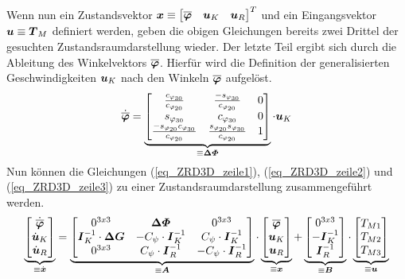 Wenn nun ein Zustandsvektor $\boldsymbol{x} \equiv \begin{bmatrix} \boldsymbol{\overline{\varphi}} & \boldsymbol{u}_K & \boldsymbol{u}_R\end{bmatrix}^T$ und ein Eingangsvektor $\boldsymbol{u} \equiv \boldsymbol{T}_M$ definiert werden, geben die obigen Gleichungen bereits zwei Drittel der gesuchten Zustandsraumdarstellung wieder. Der letzte Teil ergibt sich durch die Ableitung des Winkelvektors $\boldsymbol{\overline{\varphi}}$. Hierfür wird die Definition der generalisierten Geschwindigkeiten $\boldsymbol{u}_K$ nach den Winkeln $\boldsymbol{\overline{\varphi}}$ aufgelöst.
\begin{equation}
\label{eq_ZRD3D_zeile1}
\dot{\boldsymbol{\overline{\varphi}}} = \underbrace{\begin{bmatrix}
\frac{c_{\varphi_{30}}}{c_{\varphi_{20}}} & \frac{-s_{\varphi_{30}}}{c_{\varphi_{20}}} & 0 
\\
s_{\varphi_{30}} & c_{\varphi_{30}} & 0 
\\
\frac{-s_{\varphi_{20}}c_{\varphi_{30}}}{c_{\varphi_{20}}} &
\frac{s_{\varphi_{20}}s_{\varphi_{30}}}{c_{\varphi_{20}}} & 1
\end{bmatrix}}_{\equiv \boldsymbol{\Delta\varPhi}}\cdot \boldsymbol{u}_K
\end{equation}
Nun können die Gleichungen (\ref{eq_ZRD3D_zeile1}), (\ref{eq_ZRD3D_zeile2}) und (\ref{eq_ZRD3D_zeile3}) zu einer Zustandsraumdarstellung zusammengeführt werden.
\begin{equation}
\underbrace{\begin{bmatrix} \dot{\boldsymbol{\overline{\varphi}}} \\ \dot{\boldsymbol{u}}_K \\ \dot{\boldsymbol{u}}_R \end{bmatrix}}_{\equiv \dot{\boldsymbol{x}}} 
= 
\underbrace{\begin{bmatrix}
0^{3x3} & \boldsymbol{\Delta\varPhi} & 0^{3x3} \\
\boldsymbol{I}^{-1}_K \cdot \boldsymbol{\Delta G} & -C_{\psi}\cdot \boldsymbol{I}^{-1}_K & C_{\psi}\cdot \boldsymbol{I}^{-1}_K \\
0^{3x3} & C_{\psi}\cdot \boldsymbol{I}^{-1}_R & -C_{\psi}\cdot \boldsymbol{I}^{-1}_R
\end{bmatrix}}_{\equiv \boldsymbol{A}}
\cdot
\underbrace{\begin{bmatrix}\boldsymbol{\overline{\varphi}} \\ \boldsymbol{u}_K \\ \boldsymbol{u}_R\end{bmatrix}}_{\equiv \boldsymbol{x}}
+
\underbrace{\begin{bmatrix}
0^{3x3} \\ -\boldsymbol{I}^{-1}_K \\ \boldsymbol{I}^{-1}_R
\end{bmatrix}}_{\equiv \boldsymbol{B}}
\cdot
\underbrace{\begin{bmatrix}
T_{M1} \\ T_{M2} \\ T_{M3}
\end{bmatrix}}_{\equiv \boldsymbol{u}}
\end{equation}